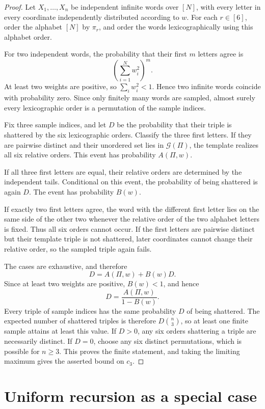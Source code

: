 \documentclass[11pt]{article}
\newcommand{\shat}{\mathcal{G}}
\begin{document}
\begin{proof}
Let $X_1,\ldots,X_n$ be independent infinite words over $[N]$, with every
letter in every coordinate independently distributed according to $w$.  For
each $r\in[6]$, order the alphabet $[N]$ by $\pi_r$, and order the words
lexicographically using this alphabet order.

For two independent words, the probability that their first $m$ letters
agree is
\[
\left(\sum_{i=1}^Nw_i^2\right)^m.
\]
At least two weights are positive, so $\sum_iw_i^2<1$.  Hence two infinite
words coincide with probability zero.  Since only finitely many words are
sampled, almost surely every lexicographic order is a permutation of the
sample indices.

Fix three sample indices, and let $D$ be the probability that their triple is
shattered by the six lexicographic orders.  Classify the three first letters.
If they are pairwise distinct and their unordered set lies in $\shat(\Pi)$,
the template realizes all six relative orders.  This event has probability
$A(\Pi,w)$.

If all three first letters are equal, their relative orders are determined by
the independent tails.  Conditional on this event, the probability of being
shattered is again $D$.  The event has probability $B(w)$.

If exactly two first letters agree, the word with the different first letter
lies on the same side of the other two whenever the relative order of the two
alphabet letters is fixed.  Thus all six orders cannot occur.  If the first
letters are pairwise distinct but their template triple is not shattered,
later coordinates cannot change their relative order, so the sampled triple
again fails.

The cases are exhaustive, and therefore
\[
D=A(\Pi,w)+B(w)D.
\]
Since at least two weights are positive, $B(w)<1$, and hence
\[
D=\frac{A(\Pi,w)}{1-B(w)}.
\]
Every triple of sample indices has the same probability $D$ of being
shattered.  The expected number of shattered triples is therefore
$D\binom n3$, so at least one finite sample attains at least this value.  If
$D>0$, any six orders shattering a triple are necessarily distinct.  If
$D=0$, choose any six distinct permutations, which is possible for $n\ge3$.
This proves the finite statement, and taking the limiting maximum gives the
asserted bound on $c_3$.
\end{proof}

\section{Uniform recursion as a special case}
\end{document}
